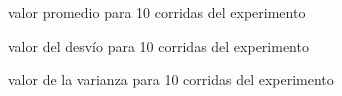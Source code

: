 \documentclass{article}
\begin{document}
\begin{figure}[!htbp]
  \begin{mytikzresize}{0.8\textwidth}
    \centering
    
    \caption{valor promedio para 10 corridas del experimento}
  \end{mytikzresize}
\end{figure}

\begin{figure}[!htbp]
  \begin{mytikzresize}{0.8\textwidth}
    \centering
    
    \caption{valor del desvío para 10 corridas del experimento}
  \end{mytikzresize}
\end{figure}

\begin{figure}[!htbp]
  \begin{mytikzresize}{0.8\textwidth}
    \centering
    
    \caption{valor de la varianza para 10 corridas del experimento}
  \end{mytikzresize}
\end{figure}

%
%
\end{document}
